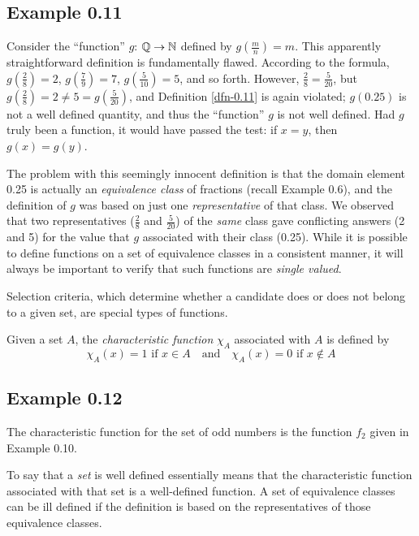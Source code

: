 \subsection*{Example 0.11}

Consider the ``function'' $g$: $\mathbb{Q} \rightarrow \mathbb{N}$ defined by $g(\frac{m}{n})
=m$. This apparently straightforward definition is fundamentally flawed.
According to the formula, $g\left(\frac{2}{8}\right)=2$, $g\left(\frac{7}{9}
\right)=7$, $g\left(\frac{5}{10}\right)=5$, and so forth. However, $\frac{2}{8}
=\frac{5}{20}$, but $g\left(\frac{2}{8}\right)=2\not=5=g\left(\frac{5}{20}
\right)$, and Definition \ref{dfn-0.11} is again violated; $g(0.25)$ is not a
well defined quantity, and thus the ``function'' $g$ is not well defined. Had
$g$ truly been a function, it would have passed the test: if $x=y$, then $g(x)=
g(y)$.

The problem with this seemingly innocent definition
is that the domain element 0.25 is actually
an \emph{equivalence class} of fractions (recall Example 0.6), and the definition
of $g$ was based on just one \emph{representative} of that class. We observed
that two representatives ($\frac{2}{8}$ and $\frac{5}{20}$) of the \emph{same}
class gave conflicting answers (2 and 5) for the value that $g$ associated with
their class (0.25). While it is possible to define functions on a set of
equivalence classes in a consistent manner, it will always be important to
verify that such functions are \emph{single valued}.

Selection criteria, which determine whether a candidate does or does not
belong to a given set, are special types of functions.

\begin{dfn}\label{dfn-0.12}
Given a set $A$, the \emph{characteristic function} $\chi_A$ associated with $A$
is defined by
\[\chi_{A}(x)=1\text{ if }x\in A\quad\text{and}\quad\chi_{A}(x)=0\text{ if }x
	\not \in A\]
\end{dfn}

\subsection*{Example 0.12}

The characteristic function for the set of odd numbers is the function $f_2$
given in Example 0.10.

To say that a \emph{set} is well defined essentially means that the
characteristic function associated with that set is a well-defined function. A
set of equivalence classes can be ill defined if the definition is based on the
representatives of those equivalence classes.

